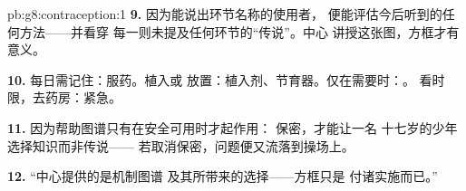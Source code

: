 \begin{solution}{pb:g8:contraception:1}
\textbf{9.} 因为能说出环节名称的使用者，
便能评估今后听到的任何方法——并看穿
每一则未提及任何环节的“传说”。中心
讲授这张图，方框才有意义。

\textbf{10.} 每日需记住：服药。植入或
放置：植入剂、节育器。仅在需要时：。
看时限，去药房：紧急。

\textbf{11.} 因为帮助图谱只有在安全可用时才起作用：
保密，才能让一名
十七岁的少年选择知识而非传说——
若取消保密，问题便又流落到操场上。

\textbf{12.} “中心提供的是机制图谱
及其所带来的选择——方框只是
付诸实施而已。”
\end{solution}
